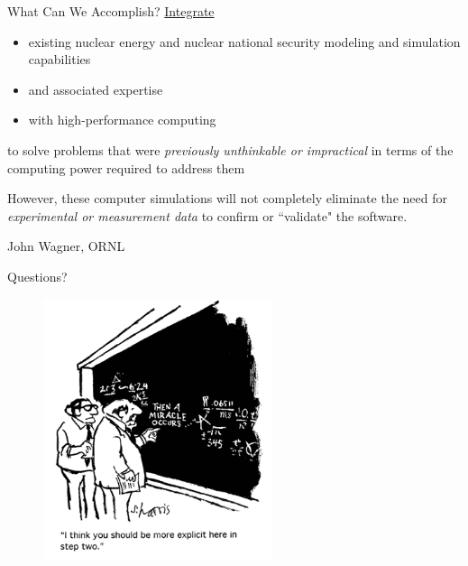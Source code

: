 \documentclass[xcolor=x11names,compress]{beamer}
\renewcommand{\(}{\begin{columns}}
\renewcommand{\)}{\end{columns}}
\newcommand{\<}[1]{\begin{column}{#1}}
\renewcommand{\>}{\end{column}}
\begin{document}
\begin{frame}{What Can We Accomplish?}
\underline{Integrate}
\begin{itemize}
\item existing nuclear energy and nuclear national security modeling and simulation capabilities
\item and associated expertise
\item with high-performance computing
\end{itemize}    
to solve problems that were \emph{previously unthinkable or impractical} in terms of the computing power required to address them

\vspace*{1em}
However, these computer simulations will not completely eliminate the need for \emph{experimental or measurement data} to confirm or ``validate" the software. 

\vspace*{1em}
\hspace*{0.25 in} John Wagner, ORNL
\end{frame}

%
%

\begin{frame}{Questions?}
\begin{figure}
\includegraphics[height=3in,clip]{math07}
\end{figure}
\end{frame}
\end{document}
